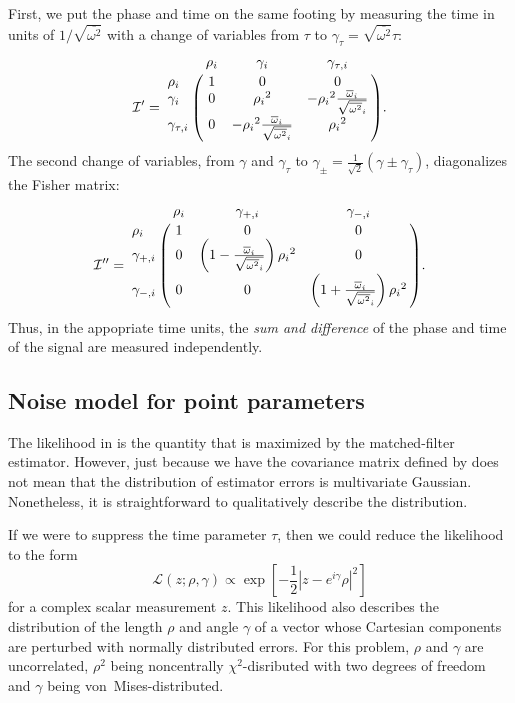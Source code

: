 \documentclass{iopart}
\let\oldmarginpar\marginpar
\renewcommand\marginpar[1]{\-\oldmarginpar[\raggedleft\footnotesize #1]%
{\raggedright\footnotesize #1}}
\begin{document}
First, we put the phase and time on the same footing by measuring the time in units of $1 / \sqrt{\overline{\omega^2}}$ with a change of variables from $\tau$ to $\gamma_\tau = \sqrt{\overline{\omega^2}} \tau$:
%
\begin{equation}
    \mathcal{I}' = \bordermatrix{
        ~ & \rho_i & \gamma_i & \gamma_{\tau,i} \cr
        \rho_i & 1 & 0 & 0 \cr
        \gamma_i & 0 & {\rho_i}^2 & -{\rho_i}^2\frac{{\overline{\omega}}_i}{\sqrt{{\overline{\omega^2}}_i}} \cr
        \gamma_{\tau,i} & 0 & -{\rho_i}^2\frac{{\overline{\omega}}_i}{\sqrt{{\overline{\omega^2}}_i}} & {\rho_i}^2
    }.
\end{equation}
%
The second change of variables, from $\gamma$ and $\gamma_\tau$ to $\gamma_\pm = \frac{1}{\sqrt{2}}(\gamma \pm \gamma_\tau)$, diagonalizes the Fisher matrix:
%
\begin{equation}
    \mathcal{I}'' = \bordermatrix{
        ~ & \rho_i & \gamma_{+,i} & \gamma_{-,i} \cr
        \rho_i & 1 & 0 & 0 \cr
        \gamma_{+,i} & 0 & \left(1 - \frac{\overline{\omega}_i}{\sqrt{\overline{\omega^2}_i}}\right){\rho_i}^2 & 0 \cr
        \gamma_{-,i} & 0 & 0 & \left(1 + \frac{\overline{\omega}_i}{\sqrt{\overline{\omega^2}_i}}\right){\rho_i}^2
    }.
\end{equation}
%
Thus, in the appopriate time units, the \textit{sum and difference} of the phase and time of the signal are measured independently.

\subsection{Noise model for point parameters}

The likelihood in  is the quantity that is maximized by the matched\nobreakdashes-filter estimator. However, just because we have the covariance matrix defined by  does not mean that the distribution of estimator errors is multivariate Gaussian. Nonetheless, it is straightforward to qualitatively describe the distribution.

If we were to suppress the time parameter $\tau$, then we could reduce the likelihood to the form
%
\begin{equation}
    \mathcal{L}(z; \rho, \gamma) \propto \exp \left[ -\frac{1}{2} \left|z - e^{i \gamma} \rho \right|^2 \right]
\end{equation}
%
for a complex scalar measurement $z$. This likelihood also describes the distribution of the length $\rho$ and angle $\gamma$ of a vector whose Cartesian components are perturbed with normally distributed errors. For this problem, $\rho$ and $\gamma$ are uncorrelated, $\rho^2$ being noncentrally $\chi^2$\nobreakdashes-disributed with two degrees of freedom and $\gamma$ being von~Mises\nobreakdashes-distributed.%
%
\marginpar{Picture here?}
\end{document}
